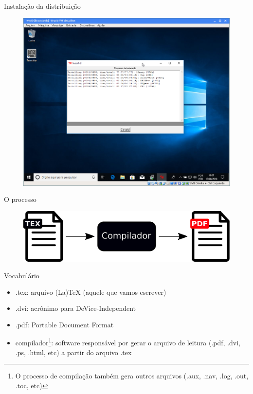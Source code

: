 \documentclass{beamer}
\begin{document}
\begin{frame}{Instala\c{c}\~ao da distribui\c{c}\~ao}
    \begin{figure}[h]
        \includegraphics[scale=0.25]{fig/texlive-08.png}
    \end{figure}
\end{frame}

\begin{frame}{O processo}
    \begin{figure}[h]
        \includegraphics[width=\textwidth]{fig/pipeline.pdf}
    \end{figure}
\end{frame}

\begin{frame}{Vocabul\'ario}
    \begin{itemize}
        \item .tex: arquivo (La)TeX (aquele que vamos escrever)
        \item .dvi: acr\^onimo para DeVice-Independent
        \item .pdf: Portable Document Format
        \item compilador\footnote{O processo de compila\c{c}\~ao tamb\'em gera outros
        arquivos (.aux, .nav, .log, .out, .toc, etc)}: software respons\'avel por
        gerar o arquivo de leitura (.pdf, .dvi, .ps, .html, etc) a partir do
        arquivo .tex
    \end{itemize}
\end{frame}
\end{document}
